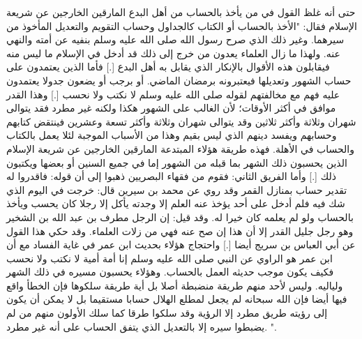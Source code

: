 حتى أنه غلظ القول في من يأخذ بالحساب من أهل البدع المارقين الخارجين عن شريعة الإسلام فقال: "الأخذ بالحساب أو الكتاب كالجداول وحساب التقويم والتعديل المأخوذ من سيرهما. وغير ذلك الذي صرح رسول الله صلى الله عليه وسلم بنفيه عن أمته والنهي عنه. ولهذا ما زال العلماء يعدون من خرج إلى ذلك قد أدخل في الإسلام ما ليس منه فيقابلون هذه الأقوال بالإنكار الذي يقابل به أهل البدع [.] فأما الذين يعتمدون على حساب الشهور وتعديلها فيعتبرونه برمضان الماضي. أو برجب أو يضعون جدولا يعتمدون عليه فهم مع مخالفتهم لقوله صلى الله عليه وسلم {لا نكتب ولا نحسب} [.] وهذا القدر موافق في أكثر الأوقات؛ لأن الغالب على الشهور هكذا ولكنه غير مطرد فقد يتوالى شهران وثلاثة وأكثر ثلاثين وقد يتوالى شهران وثلاثة وأكثر تسعة وعشرين فينتقض كتابهم وحسابهم ويفسد دينهم الذي ليس بقيم وهذا من الأسباب الموجبة لئلا يعمل بالكتاب والحساب في الأهلة. فهذه طريقة هؤلاء المبتدعة المارقين الخارجين عن شريعة الإسلام الذين يحسبون ذلك الشهر بما قبله من الشهور إما في جميع السنين أو بعضها ويكتبون ذلك [.] وأما الفريق الثاني: فقوم من فقهاء البصريين ذهبوا إلى أن قوله: {فاقدروا له} تقدير حساب بمنازل القمر وقد روي عن محمد بن سيرين قال: خرجت في اليوم الذي شك فيه فلم أدخل على أحد يؤخذ عنه العلم إلا وجدته يأكل إلا رجلا كان يحسب ويأخذ بالحساب ولو لم يعلمه كان خيرا له. وقد قيل: إن الرجل مطرف بن عبد الله بن الشخير وهو رجل جليل القدر إلا أن هذا إن صح عنه فهي من زلات العلماء. وقد حكي هذا القول عن أبي العباس بن سريج أيضا [.] واحتجاج هؤلاء بحديث ابن عمر في غاية الفساد مع أن ابن عمر هو الراوي عن النبي صلى الله عليه وسلم {إنا أمة أمية لا نكتب ولا نحسب} فكيف يكون موجب حديثه العمل بالحساب. وهؤلاء يحسبون مسيره في ذلك الشهر ولياليه. وليس لأحد منهم طريقة منضبطة أصلا بل أية طريقة سلكوها فإن الخطأ واقع فيها أيضا فإن الله سبحانه لم يجعل لمطلع الهلال حسابا مستقيما بل لا يمكن أن يكون إلى رؤيته طريق مطرد إلا الرؤية وقد سلكوا طرقا كما سلك الأولون منهم من لم يضبطوا سيره إلا بالتعديل الذي يتفق الحساب على أنه غير مطرد.
". 



